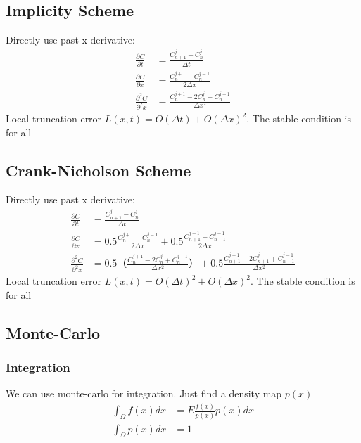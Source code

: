 \subsection{Implicity Scheme}
Directly use past x derivative:
\begin{equation}
\begin{aligned}
\frac{\partial C}{\partial t} &= \frac{C^j_{n+1} - C^j_{n}}{\Delta t} \\
\frac{\partial C}{\partial x} &= \frac{C^{j+1}_{n} - C^{j-1}_{n}}{2 \Delta x}\\
\frac{\partial^2 C}{\partial^2 x} &= \frac{C^{j+1}_{n} -2C^{j}_{n}+ C^{j-1}_{n}}{\Delta x ^2}
\end{aligned}
\end{equation}
Local truncation error $L(x,t) = O(\Delta t) + O(\Delta x)^2$. The stable condition is for all

\subsection{Crank-Nicholson Scheme}
Directly use past x derivative:
\begin{equation}
\begin{aligned}
\frac{\partial C}{\partial t} &= \frac{C^j_{n+1} - C^j_{n}}{\Delta t} \\
\frac{\partial C}{\partial x} &= 0.5 \frac{C^{j+1}_{n} - C^{j-1}_{n}}{2 \Delta x} + 0.5 \frac{C^{j+1}_{n+1} - C^{j-1}_{n+1}}{2 \Delta x}\\
\frac{\partial^2 C}{\partial^2 x} &= 0.5 （\frac{C^{j+1}_{n} -2C^{j}_{n}+ C^{j-1}_{n}}{\Delta x ^2}） + 0.5 \frac{C^{j+1}_{n+1} -2C^{j}_{n+1}+ C^{j-1}_{n+1}}{\Delta x ^2}
\end{aligned}
\end{equation}
Local truncation error $L(x,t) = O(\Delta t)^2 + O(\Delta x)^2$. The stable condition is for all


\subsection{Monte-Carlo}
\subsubsection{Integration}
We can use monte-carlo for integration. Just find a density map $p(x)$
\begin{equation}
\begin{aligned}
 \int_\Omega f(x) dx &= E \frac{f(x)}{p(x)} p(x) dx \\
 \int_\Omega p(x) dx &= 1
\end{aligned}
\end{equation}

